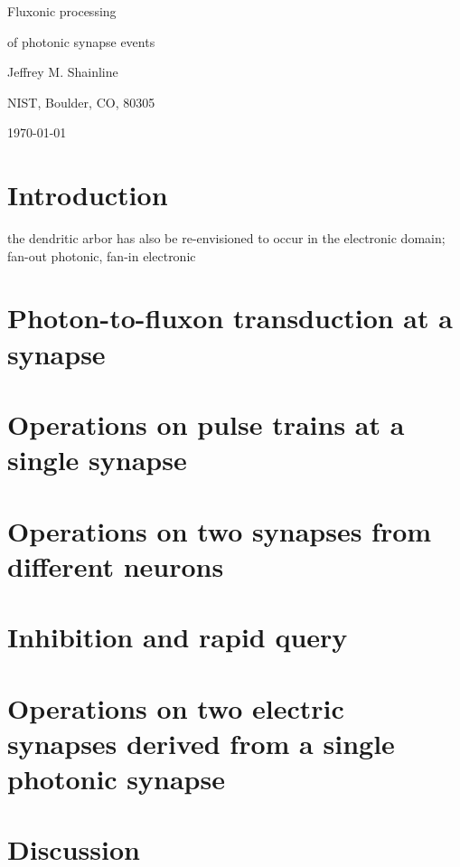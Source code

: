 \documentclass[twocolumn]{article}
\begin{document}
	
	\centerline{\LARGE Fluxonic processing}
	\vspace{0.5em}
	\centerline{\LARGE of photonic synapse events}
	\vspace{0.75em}
	\centerline{\large Jeffrey M. Shainline}
	\vspace{0.5em}
	\centerline{\normalsize NIST, Boulder, CO, 80305}
	\vspace{0.5em}
	\centerline{\small \today}
	
\begin{abstract}

\end{abstract}

\tableofcontents

\section{\label{sec:introduction}Introduction}
	
the dendritic arbor has also be re-envisioned to occur in the electronic domain; fan-out photonic, fan-in electronic	

\begin{figure*} 
\end{figure*}

\section{\label{sec:synapse}Photon-to-fluxon transduction at a synapse}

\section{\label{sec:short_term}Operations on pulse trains at a single synapse}

\section{\label{sec:synapses_from_different_neurons}Operations on two synapses from different neurons}

\section{\label{sec:inhibition_and_rapid_query}Inhibition and rapid query}

\section{\label{sec:synapses_from_the_same_neuron}Operations on two electric synapses derived from a single photonic synapse}

\section{\label{sec:discussion}Discussion}
	
\newpage
\appendix



\end{document}

